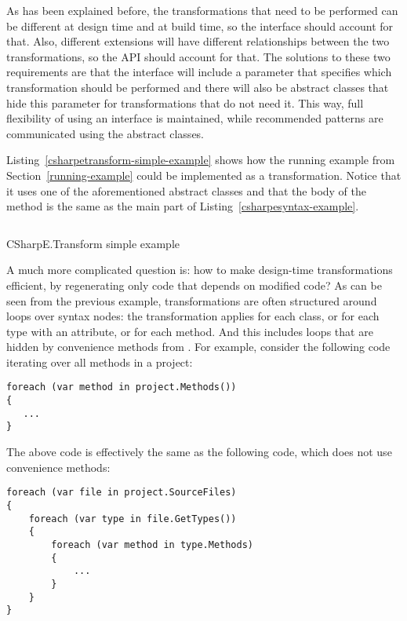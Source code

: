 As has been explained before, the transformations that need to be performed can be different at design time and at build time, so the interface should account for that. Also, different extensions will have different relationships between the two transformations, so the \ac{API} should account for that. The solutions to these two requirements are that the interface will include a parameter that specifies which transformation should be performed and there will also be abstract classes that hide this parameter for transformations that do not need it. This way, full flexibility of using an interface is maintained, while recommended patterns are communicated using the abstract classes.

Listing~\ref{csharpetransform-simple-example} shows how the running example from Section~\ref{running-example} could be implemented as a transformation. Notice that it uses one of the aforementioned abstract classes and that the body of the method is the same as the main part of Listing~\ref{csharpesyntax-example}.

\begin{listing}
\inputminted[firstline=9,lastline=27]{csharp}{samples/CSharpETransform.Simple/EntityTransformation.cs}
\caption{CSharpE.Transform simple example}
\label{csharpetransform-simple-example}
\end{listing}

\medskip

A much more complicated question is: how to make design-time transformations efficient, by regenerating only code that depends on modified code? As can be seen from the previous example, transformations are often structured around  loops over syntax nodes: the transformation applies for each class, or for each type with an attribute, or for each method. And this includes  loops that are hidden by convenience methods from . For example, consider the following code iterating over all methods in a project:

\begin{verbatim}
foreach (var method in project.Methods())
{
   ...
}
\end{verbatim}

The above code is effectively the same as the following code, which does not use convenience methods:

\begin{verbatim}
foreach (var file in project.SourceFiles)
{
    foreach (var type in file.GetTypes())
    {
        foreach (var method in type.Methods)
        {
            ...
        }
    }
}
\end{verbatim}

